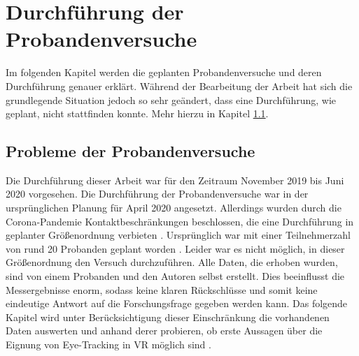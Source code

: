 
\chapter{Durchführung  der Probandenversuche} 

Im folgenden Kapitel werden die geplanten Probandenversuche und deren Durchführung genauer erklärt. Während der Bearbeitung der Arbeit hat sich die grundlegende Situation jedoch so sehr geändert, dass eine Durchführung, wie geplant, nicht stattfinden konnte. Mehr hierzu in Kapitel \ref{section:corona}.

\section{Probleme der Probandenversuche}
\label{section:corona}
Die Durchführung dieser Arbeit war für den Zeitraum November 2019 bis Juni 2020 vorgesehen. Die Durchführung der Probandenversuche war in der ursprünglichen Planung für April 2020 angesetzt. Allerdings wurden durch die Corona-Pandemie  Kontaktbeschränkungen beschlossen, die eine Durchführung in geplanter Größenordnung verbieten . Ursprünglich war mit einer Teilnehmerzahl von rund 20 Probanden geplant worden . Leider war es nicht möglich,  in dieser Größenordnung den Versuch durchzuführen. Alle Daten, die erhoben wurden, sind von einem  Probanden und den Autoren selbst erstellt. Dies beeinflusst die Messergebnisse enorm, sodass keine klaren Rückschlüsse und somit keine eindeutige Antwort auf die Forschungsfrage gegeben werden kann. Das folgende Kapitel wird unter Berücksichtigung dieser Einschränkung die vorhandenen Daten auswerten und anhand derer probieren, ob erste Aussagen über die Eignung von Eye-Tracking in VR möglich sind .

